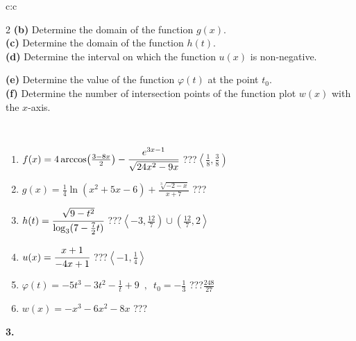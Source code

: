 \documentclass[10pt]{report}
\begin{document}
\begin{tabular}{c:c}
\begin{minipage}[c][104.5mm][t]{0.5\linewidth}
\begin{center}
\begin{minipage}{0.95\linewidth}
\begin{center}
{\begin{multicols}{2}
\textbf{(b)} Determine the domain of the function \(g(x)\). \\[1mm]
\textbf{(c)} Determine the domain of the function \(h(t)\). \\[1mm]
\textbf{(d)} Determine the interval on which the function \(u(x)\) is non-negative. \par \columnbreak
\textbf{(e)} Determine the value of the function \(\varphi(t)\) at the point \(t_0\). \\[1mm]
\textbf{(f)} Determine the number of intersection points of the function plot \(w(x)\) with the \(x\)-axis. \\[1mm]
\end{multicols}
}
\end{center}
\end{minipage}
\\[4mm]
\begin{minipage}{0.79\linewidth}
\begin{center}
\begin{varwidth}{\linewidth}
\begin{enumerate}
\small
\item $f(x) = 4\arccos\!\left( \frac{3-8x}{2} \right) - \cfrac{e^{3x-1}}{\sqrt{24x^2-9x}}$\quad \dotfill\; ???\;\dotfill \quad $\left\langle\frac{1}{8} , \frac{3}{8}\right)$
\item $g(x) = \frac{1}{4} \ln{\!(x^2+5x-6)}+\frac{\sqrt[3]{-2-x}}{x+7}$\quad \dotfill\; ???\;\dotfill {}
\item $h(t) = \cfrac{\sqrt{9-t^2}}{\log_3(7-\frac{7}{2}t)}$\quad \dotfill\; ???\;\dotfill \quad $\left\langle-3 , \frac{12}{7}\right)\cup\left(\frac{12}{7} , 2\right\rangle$
\item $u(x) = \cfrac{x+1}{-4x+1}$\quad \dotfill\; ???\;\dotfill \quad $\left\langle-1 , \frac{1}{4}\right\rangle$
\item $\varphi(t) = -5t^3-3t^2-\frac{1}{t}+9 \enspace , \enspace t_0=-\frac{1}{3}$\quad \dotfill\; ???\;\dotfill \quad $\frac{248}{27}$
\item $w(x) = -x^3-6x^2-8x$\quad \dotfill\; ???\;\dotfill {}
\end{enumerate}
\end{varwidth}
\end{center}
\end{minipage}
\begin{minipage}{0.20\linewidth}
\begin{center}
{\Huge\bfseries 3.} \\[2mm]

\end{center}
\end{minipage}
\end{center}
\end{minipage}
\end{tabular}
\end{document}
